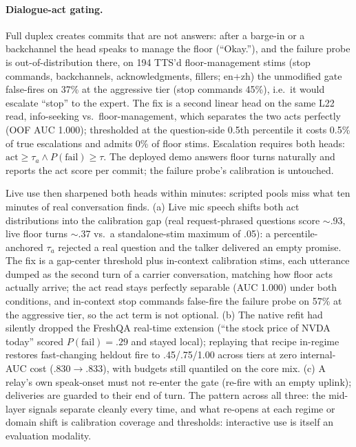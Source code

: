 \paragraph{Dialogue-act gating.} Full duplex creates commits that are
not answers: after a barge-in or a backchannel the head speaks to
manage the floor (``Okay.''), and the failure probe is
out-of-distribution there, on 194 TTS'd floor-management stims
(stop commands, backchannels, acknowledgments, fillers; en+zh) the
unmodified gate false-fires on 37\% at the aggressive tier (stop
commands 45\%), i.e.\ it would escalate ``stop'' to the expert. The
fix is a second linear head on the same L22 read,
info-seeking vs.\ floor-management, which separates the two acts
perfectly (OOF AUC 1.000); thresholded at the question-side 0.5th
percentile it costs 0.5\% of true escalations and admits 0\% of floor
stims. Escalation requires both heads:
$\mathrm{act}\ge\tau_a \wedge P(\mathrm{fail})\ge\tau$. The deployed
demo answers floor turns naturally and reports the act score per
commit; the failure probe's calibration is untouched.

Live use then sharpened both heads within minutes: scripted pools
miss what ten minutes of real conversation finds. (a) Live mic speech
shifts both act distributions into the calibration gap (real
request-phrased questions score $\sim$.93, live floor turns $\sim$.37
vs.\ a standalone-stim maximum of .05): a percentile-anchored
$\tau_a$ rejected a real question and the talker delivered an empty
promise. The fix is a gap-center threshold plus in-context
calibration stims, each utterance dumped as the second turn of a
carrier conversation, matching how floor acts actually arrive; the
act read stays perfectly separable (AUC 1.000) under both conditions,
and in-context stop commands false-fire the failure probe on
57\% at the aggressive tier, so the act term is not optional. (b) The
native refit had silently dropped the FreshQA real-time extension
(``the stock price of NVDA today'' scored $P(\mathrm{fail}){=}.29$
and stayed local); replaying that recipe in-regime restores
fast-changing heldout fire to .45/.75/1.00 across tiers at zero
internal-AUC cost (.830$\to$.833), with budgets still quantiled on
the core mix. (c) A relay's own speak-onset must not re-enter the
gate (re-fire with an empty uplink); deliveries are guarded to their
end of turn. The pattern across all three: the mid-layer signals
separate cleanly every time, and what re-opens at each regime or
domain shift is calibration coverage and thresholds: interactive
use is itself an evaluation modality.

